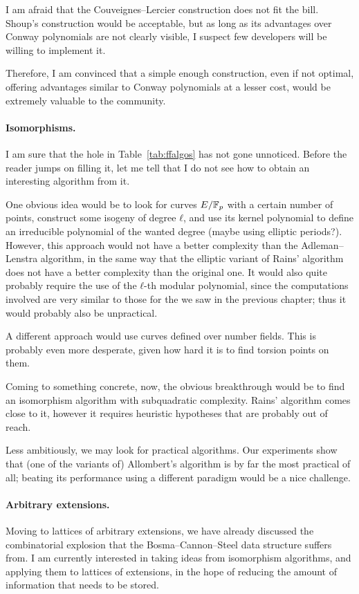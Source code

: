 \documentclass[b5layout]{hdr}
\begin{document}
I am afraid that the Couveignes--Lercier construction does not fit the
bill. %
Shoup's construction would be acceptable, but as long as its
advantages over Conway polynomials are not clearly visible, I suspect
few developers will be willing to implement it. %

Therefore, I am convinced that a simple enough construction, even if
not optimal, offering advantages similar to Conway polynomials at a
lesser cost, would be extremely valuable to the community. %

\paragraph{Isomorphisms.}
I am sure that the hole in Table~\ref{tab:ffalgos} has not gone
unnoticed. %
Before the reader jumps on filling it, let me tell that I do not see
how to obtain an interesting algorithm from it. %

One obvious idea would be to look for curves $E/\mathbb{F}_p$ with a certain
number of points, construct some isogeny of degree $ℓ$, and use its
kernel polynomial to define an irreducible polynomial of the wanted
degree (maybe using elliptic periods?). %
However, this approach would not have a better complexity than the
Adleman--Lenstra algorithm, in the same way that the elliptic variant
of Rains' algorithm does not have a better complexity than the original
one. %
It would also quite probably require the use of the $ℓ$-th modular
polynomial, since the computations involved are very similar to those
for the  we saw in the previous chapter; thus
it would probably also be unpractical. %

A different approach would use curves defined over number fields. %
This is probably even more desperate, given how hard it is to find
torsion points on them. %

Coming to something concrete, now, the obvious breakthrough would be
to find an isomorphism algorithm with subquadratic complexity. %
Rains' algorithm comes close to it, however it requires heuristic
hypotheses that are probably out of reach. %

Less ambitiously, we may look for practical algorithms. %
Our experiments show that (one of the variants of) Allombert's
algorithm is by far the most practical of all; beating its performance
using a different paradigm would be a nice challenge. %


\paragraph{Arbitrary extensions.}
Moving to lattices of arbitrary extensions, we have already discussed
the combinatorial explosion that the Bosma--Cannon--Steel data
structure suffers from. %
I am currently interested in taking ideas from isomorphism algorithms,
and applying them to lattices of extensions, in the hope of reducing
the amount of information that needs to be stored. %
\end{document}
